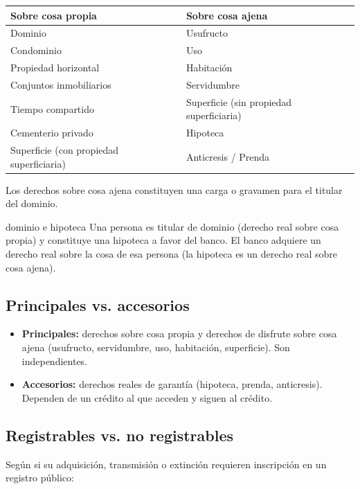 \documentclass[12pt,oneside]{book}
\begin{document}
\begin{table}[H]
\centering
\begin{tabularx}{\textwidth}{XX}
\toprule
\textbf{Sobre cosa propia} & \textbf{Sobre cosa ajena} \\
\midrule
Dominio & Usufructo \\
Condominio & Uso \\
Propiedad horizontal & Habitaci\'on \\
Conjuntos inmobiliarios & Servidumbre \\
Tiempo compartido & Superficie (sin propiedad superficiaria) \\
Cementerio privado & Hipoteca \\
Superficie (con propiedad superficiaria) & Anticresis / Prenda \\
\bottomrule
\end{tabularx}
\end{table}

Los derechos sobre cosa ajena constituyen una carga o gravamen para el titular del dominio.

\begin{example}{dominio e hipoteca}
Una persona es titular de dominio (derecho real sobre cosa propia) y constituye una hipoteca a favor del banco. El banco adquiere un derecho real sobre la cosa de esa persona (la hipoteca es un derecho real sobre cosa ajena).
\end{example}

\subsection{Principales vs. accesorios}

\begin{itemize}
    \item \textbf{Principales:} derechos sobre cosa propia y derechos de disfrute sobre cosa ajena (usufructo, servidumbre, uso, habitaci\'on, superficie). Son independientes.
    \item \textbf{Accesorios:} derechos reales de garant\'ia (hipoteca, prenda, anticresis). Dependen de un cr\'edito al que acceden y siguen al cr\'edito.
\end{itemize}

\subsection{Registrables vs. no registrables}

Seg\'un si su adquisici\'on, transmisi\'on o extinci\'on requieren inscripci\'on en un registro p\'ublico:
\end{document}
